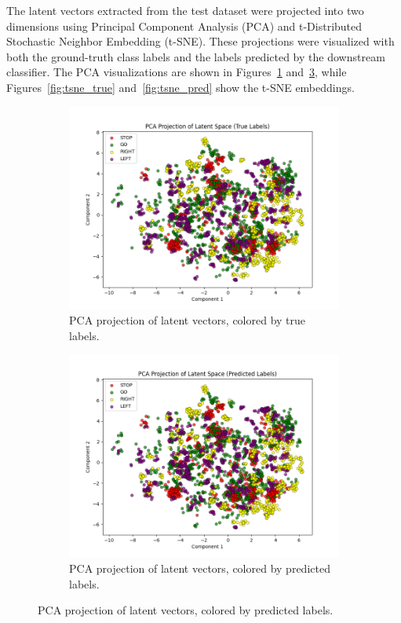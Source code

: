 The latent vectors extracted from the test dataset were projected into two dimensions using Principal Component Analysis (PCA) and t-Distributed Stochastic Neighbor Embedding (t-SNE). These projections were visualized with both the ground-truth class labels and the labels predicted by the downstream classifier. The PCA visualizations are shown in Figures~\ref{fig:pca_true} and~\ref{fig:pca_pred}, while Figures~\ref{fig:tsne_true} and~\ref{fig:tsne_pred} show the t-SNE embeddings.

\begin{figure}[htbp]
    \centering
    \begin{subfigure}[b]{0.49\textwidth}
        \includegraphics[width=\textwidth]{img/vae_results/pca_latent_space_true_labels.png}
        \caption{PCA projection of latent vectors, colored by true labels.}
        \label{fig:pca_true}
    \end{subfigure}
    \hfill
    \begin{subfigure}[b]{0.49\textwidth}
        \includegraphics[width=\textwidth]{img/vae_results/pca_latent_space_predicted_labels.png}
        \caption{PCA projection of latent vectors, colored by predicted labels.}
        \label{fig:pca_pred}
    \end{subfigure}
\end{figure}

